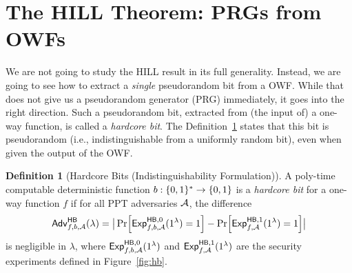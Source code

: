 \documentclass[a4paper,table,dvipsnames]{article}
\theoremstyle{definition}
\newtheorem{definition}{Definition}[section]
\begin{document}
\section{The HILL Theorem: PRGs from OWFs}
We are not going to study the HILL result in its full generality. Instead, we are going to see how to extract a \emph{single} pseudorandom bit from a OWF. While that does not give us a pseudorandom generator (PRG) immediately, it goes into the right direction. Such a pseudorandom bit, extracted from (the input of) a one-way function, is called a \emph{hardcore bit}. The Definition~\ref{def:hcb-ind} states that this bit is pseudorandom (i.e., indistinguishable from a uniformly random bit), even when given the output of the OWF.

\begin{definition}[Hardcore Bits (Indistinguishability Formulation)]\label{def:hcb-ind}
A poly-time computable deterministic function $b:\{0,1\}^*\rightarrow\{0,1\}$ is a \emph{hardcore bit} for a one-way function $f$ if
for all PPT adversaries $\mathcal{A}$, the difference
\[ \mathsf{Adv}^{\mathsf{HB}}_{f,b,\adv}(\lambda)=\big|\prob{{\mathsf{Exp}}_{f,b,\adv}^{\mathsf{HB},0}(1^\lambda) = 1} 
   - \prob{{\mathsf{Exp}}_{f,\adv}^{\mathsf{HB},1}(1^\lambda) = 1}\big| \]
is negligible in $\lambda$, where ${\mathsf{Exp}}_{f,b,\mathcal{A}}^{\mathsf{HB},0}(1^\lambda)$ and ${\mathsf{Exp}}_{f,\mathcal{A}}^{\mathsf{HB},1}(1^\lambda)$ are the security experiments defined in Figure~\ref{fig:hb}.
\end{definition}
\end{document}
